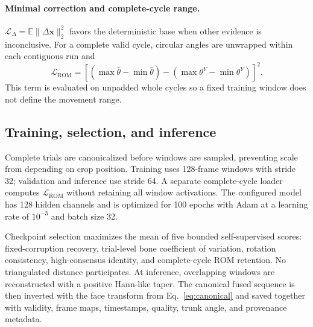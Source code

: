 \paragraph{Minimal correction and complete-cycle range.}
$\mathcal{L}_{\Delta}=\mathbb{E}\lVert\Delta\mathbf{x}\rVert_2^2$ favors the
deterministic base when other evidence is inconclusive. For a complete valid
cycle, circular angles are unwrapped within each contiguous run and
\begin{equation}
 \mathcal{L}_{\mathrm{ROM}}=
 \left[(\max\widehat{\theta}-\min\widehat{\theta})-
       (\max\theta^{Y}-\min\theta^{Y})\right]^2.
\end{equation}
This term is evaluated on unpadded whole cycles so a fixed training window does
not define the movement range.

\subsection{Training, selection, and inference}

Complete trials are canonicalized before windows are sampled, preventing scale
from depending on crop position. Training uses 128-frame windows with stride 32;
validation and inference use stride 64. A separate complete-cycle loader
computes $\mathcal{L}_{\mathrm{ROM}}$ without retaining all window activations.
The configured model has 128 hidden channels and is optimized for 100 epochs with
Adam at a learning rate of $10^{-3}$ and batch size 32.

Checkpoint selection maximizes the mean of five bounded self-supervised scores:
fixed-corruption recovery, trial-level bone coefficient of variation,
rotation consistency, high-consensus identity, and complete-cycle ROM
retention. No triangulated distance participates. At inference, overlapping
windows are reconstructed with a positive Hann-like taper. The canonical fused
sequence is then inverted with the face transform from Eq.~\eqref{eq:canonical}
and saved together with validity, frame maps, timestamps, quality, trunk angle,
and provenance metadata.
